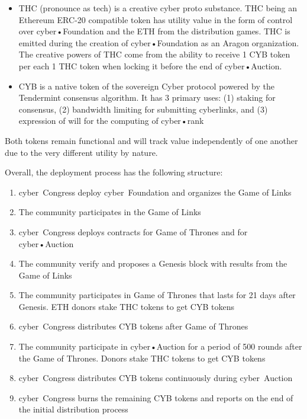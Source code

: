 \documentclass[8pt,oneside]{amsart}
\begin{document}
\begin{itemize}
\item THC (pronounce as tech) is a creative cyber proto substance. THC being an Ethereum ERC-20 compatible token has utility value in the form of control over cyber•Foundation and the ETH from the distribution games. THC is emitted during the creation of cyber•Foundation as an Aragon organization. The creative powers of THC come from the ability to receive 1 CYB token per each 1 THC token when locking it before the end of cyber•Auction.
\item CYB is a native token of the sovereign Cyber protocol powered by the Tendermint consensus algorithm. It has 3 primary uses: (1) staking for consensus, (2) bandwidth limiting for submitting cyberlinks, and (3) expression of will for the computing of cyber•rank
\end{itemize}

Both tokens remain functional and will track value independently of one another due to the very different utility by nature.

Overall, the deployment process has the following structure:

\begin{enumerate}
 \item cyber~Congress deploy cyber~Foundation and organizes the Game of Links
 \item The community participates in the Game of Links
 \item cyber~Congress deploys contracts for Game of Thrones and for cyber•Auction
 \item The community verify and proposes a Genesis block with results from the Game of Links
 \item The community participates in Game of Thrones that lasts for 21 days after Genesis. ETH donors stake THC tokens to get CYB tokens
 \item cyber~Congress distributes CYB tokens after Game of Thrones
 \item The community participate in cyber•Auction for a period of 500 rounds after the Game of Thrones. Donors stake THC tokens to get CYB tokens
 \item cyber~Congress distributes CYB tokens continuously during cyber~Auction
 \item cyber~Congress burns the remaining CYB tokens and reports on the end of the initial distribution process
\end{enumerate}
\end{document}
